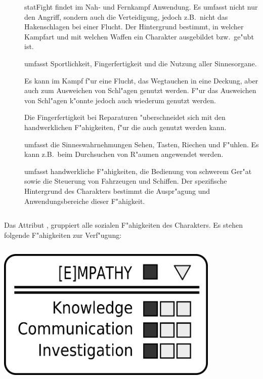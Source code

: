 \begin{description}
    \item[] stat{Fight} findet im Nah- und Fernkampf Anwendung. Es umfasst nicht nur den Angriff, sondern auch die 
        Verteidigung, jedoch z.B.~nicht das Hakenschlagen bei einer Flucht. Der Hintergrund bestimmt, in welcher Kampfart und mit welchen Waffen ein Charakter ausgebildet bzw.~ge"ubt ist.
    \item[]  umfasst Sportlichkeit, Fingerfertigkeit und die Nutzung aller Sinnesorgane. 
    
        Es kann im Kampf f"ur eine Flucht, das Wegtauchen in eine Deckung, aber auch zum Ausweichen von Schl"agen genutzt werden. F"ur das Ausweichen von Schl"agen k"onnte jedoch auch wiederum  genutzt werden.

        Die Fingerfertigkeit bei Reparaturen "uberschneidet sich mit den handwerklichen F"ahigkeiten, f"ur die auch  genutzt werden kann.
    
         umfasst die Sinneswahrnehmungen Sehen, Tasten, Riechen und F"uhlen. Es kann z.B.~beim Durchsuchen von R"aumen angewendet werden. 
    \item[]  umfasst handwerkliche F"ahigkeiten, die Bedienung von schwerem Ger"at sowie die Steuerung von 
        Fahrzeugen und Schiffen. Der spezifische Hintergrund des Charakters bestimmt die Auspr"agung und Anwendungsbereiche dieser F"ahigkeit.
\end{description}

\medskip
\begin{column}[l]{0.55}
    Das Attribut , gruppiert alle sozialen F"ahigkeiten des Charakters. Es stehen folgende F"ahigkeiten zur Verf"ugung:
\end{column}
\begin{column}[r]{0.45}
    \centering
    \includegraphics[width=0.80\textwidth]{images/character_empathy.png}
\end{column}

